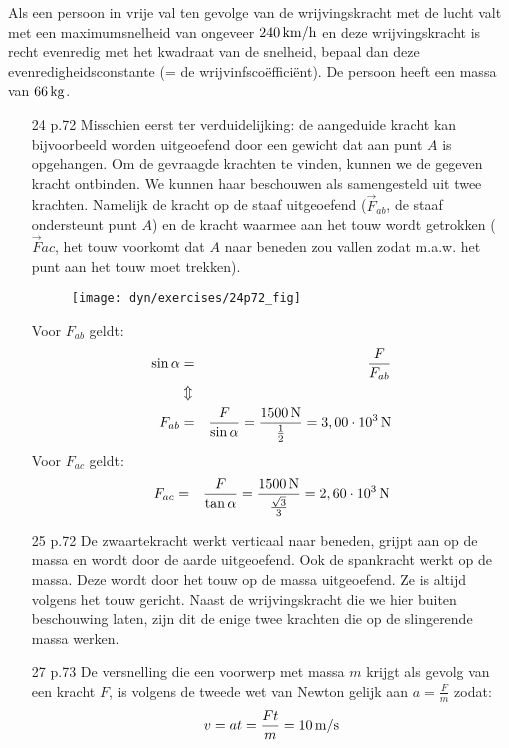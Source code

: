 \documentclass{ximera}
\begin{document}
\begin{exercise} Als een persoon in vrije val ten gevolge van de
wrijvingskracht met de lucht valt met een maximumsnelheid van
ongeveer $240\rm\,km/h$ en deze wrijvingskracht is recht evenredig
met het kwadraat van de snelheid, bepaal dan deze
evenredigheidsconstante (= de wrijvinfsco\"effici\"ent). De persoon
heeft een massa van $66\rm\,kg$.


\begin{oplossing}
    \begin{itemize}
\item[24 p.72]Misschien eerst ter verduidelijking: de aangeduide kracht kan bijvoorbeeld worden uitgeoefend door een gewicht dat aan punt $A$ is opgehangen. Om de gevraagde krachten te vinden, kunnen we de gegeven kracht ontbinden. We kunnen haar beschouwen als samengesteld uit twee krachten. Namelijk de kracht op de staaf uitgeoefend ($\vec{F}_{ab}$, de staaf ondersteunt punt $A$) en de kracht waarmee aan het touw wordt getrokken ($\vec{F}{ac}$, het touw voorkomt dat $A$ naar beneden zou vallen zodat m.a.w. het punt aan het touw moet trekken).
    \begin{figure}[h]
    \centering\texttt{[image: dyn/exercises/24p72\_fig]}
    \end{figure}
    \newline
    Voor $F_{ab}$ geldt:
    \begin{eqnarray*}
    \sin{\alpha}&=&\frac{F}{F_{ab}}\\
    &\Updownarrow&\\
    F_{ab}&=&\frac{F}{\sin{\alpha}}=\frac{1500\rm\,N}{\frac{1}{2}}=3,00\cdot10^3\rm\,N
    \end{eqnarray*}
    Voor $F_{ac}$ geldt:
    \begin{eqnarray*}
    F_{ac}&=&\frac{F}{\tan{\alpha}}=\frac{1500\rm\,N}{\frac{\sqrt{3}}{3}}=2,60\cdot10^3\rm\,N
    \end{eqnarray*}

\item[25 p.72]De zwaartekracht werkt verticaal naar beneden, grijpt aan op de massa en wordt door de aarde uitgeoefend. Ook de spankracht werkt op de massa. Deze wordt door het touw op de massa uitgeoefend. Ze is altijd volgens het touw gericht. Naast de wrijvingskracht die we hier buiten beschouwing laten, zijn dit de enige twee krachten die op de slingerende massa werken.

\item[27 p.73]De versnelling die een voorwerp met massa $m$ krijgt als gevolg van een kracht $F$, is volgens de tweede wet van Newton gelijk aan $a=\frac{F}{m}$ zodat:
\begin{eqnarray*}
v=at=\frac{Ft}{m}=10\rm\,m/s
\end{eqnarray*}


\end{itemize}
\end{oplossing}
\end{exercise}
\end{document}

